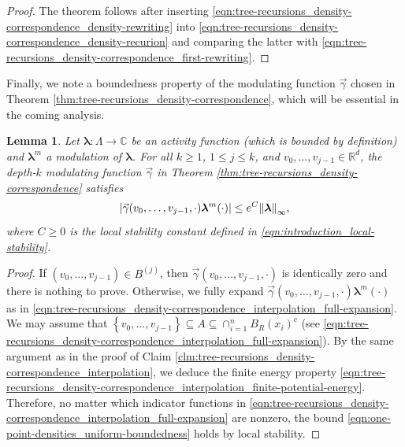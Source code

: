 \documentclass[11pt]{article}
\newcommand{\R}{\mathbb R}
\newcommand{\C}{\mathbb C}
\newcommand{\bl}{\bm{\lambda}}
\newcommand{\lsconst}{C}
\newcommand{\hcconst}{R}
\newcommand{\set}[1]{\left\{#1\right\}}
\numberwithin{equation}{section}
\theoremstyle{plain}
\newtheorem{lemma}[theorem]{Lemma}
\theoremstyle{definition}
\theoremstyle{remark}
\begin{document}
\begin{proof}
The theorem follows after inserting \eqref{eqn:tree-recursions_density-correspondence_density-rewriting} into \eqref{eqn:tree-recursions_density-correspondence_density-recurion} and comparing the latter with \eqref{eqn:tree-recursions_density-correspondence_first-rewriting}.
\end{proof}

Finally, we note a boundedness property of the modulating function $\vec{\gamma}$ chosen in Theorem \ref{thm:tree-recursions_density-correspondence}, which will be essential in the coming analysis.

\begin{lemma}
\label{lem:one-point-densities_uniform-boundedness}
Let $\bl:\Lambda\rightarrow\C$ be an activity function (which is bounded by definition) and $\bl^{m}$ a modulation of $\bl$.
For all $k\ge 1$, $1\le j\le k$, and $v_{0},\dots,v_{j-1}\in\R^{d}$, the depth-$k$ modulating function $\vec{\gamma}$ in Theorem \ref{thm:tree-recursions_density-correspondence} satisfies 
\begin{equation}
\label{eqn:one-point-densities_uniform-boundedness}
\abs{\vec{\gamma}(v_{0},\dots,v_{j-1},\cdot)\bl^{m}(\cdot)}\le e^{\lsconst}\norm{\bl}_{\infty},
\end{equation}
where $\lsconst\ge 0$ is the local stability constant defined in \eqref{eqn:introduction_local-stability}.
\end{lemma}

\begin{proof}
If $(v_{0},\dots,v_{j-1})\in B^{(j)}$, then $\vec{\gamma}(v_{0},\dots,v_{j-1},\cdot)$ is identically zero and there is nothing to prove.
Otherwise, we fully expand $\vec{\gamma}(v_{0},\dots,v_{j-1},\cdot)\bl^{m}(\cdot)$ as in \eqref{eqn:tree-recursions_density-correspondence_interpolation_full-expansion}.
We may assume that $\set{v_{0},\dots,v_{j-1}}\subseteq A\subseteq\cap_{i=1}^{n}B_{\hcconst}(x_{i})^{c}$ (see \eqref{eqn:tree-recursions_density-correspondence_interpolation_full-expansion}).
By the same argument as in the proof of Claim \ref{clm:tree-recursions_density-correspondence_interpolation}, we deduce the finite energy property \eqref{eqn:tree-recursions_density-correspondence_interpolation_finite-potential-energy}.
Therefore, no matter which indicator functions in \eqref{eqn:tree-recursions_density-correspondence_interpolation_full-expansion} are nonzero, the bound \eqref{eqn:one-point-densities_uniform-boundedness} holds by local stability.
\end{proof}
\end{document}
